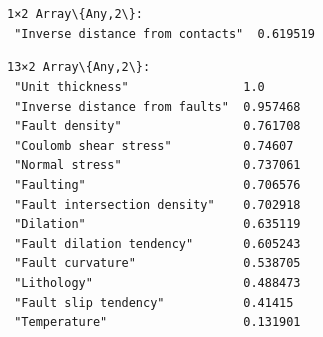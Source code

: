 \documentclass[11pt]{article}
\begin{document}
    \begin{center}
    \end{center}
    { \hspace*{\fill} \\}

    \begin{Verbatim}[commandchars=\\\{\}]

    \end{Verbatim}

    \begin{center}
    \end{center}
    { \hspace*{\fill} \\}

    \begin{Verbatim}[commandchars=\\\{\}]

    \end{Verbatim}


    \begin{Verbatim}[commandchars=\\\{\}]
1×2 Array\{Any,2\}:
 "Inverse distance from contacts"  0.619519
    \end{Verbatim}



    \begin{Verbatim}[commandchars=\\\{\}]
13×2 Array\{Any,2\}:
 "Unit thickness"                1.0
 "Inverse distance from faults"  0.957468
 "Fault density"                 0.761708
 "Coulomb shear stress"          0.74607
 "Normal stress"                 0.737061
 "Faulting"                      0.706576
 "Fault intersection density"    0.702918
 "Dilation"                      0.635119
 "Fault dilation tendency"       0.605243
 "Fault curvature"               0.538705
 "Lithology"                     0.488473
 "Fault slip tendency"           0.41415
 "Temperature"                   0.131901
    \end{Verbatim}


    \begin{center}
    \end{center}
    { \hspace*{\fill} \\}
\end{document}
